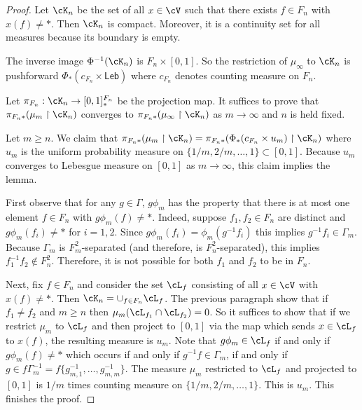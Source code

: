 \documentclass[12pt]{article}
\theoremstyle{plain}
\theoremstyle{definition}
\theoremstyle{remark}
\newcommand{\G}{\Gamma}
\newcommand{\resto}{\upharpoonright}
\begin{document}
\begin{proof}
Let $\cK_n$ be the set of all $x\in \cV$ such that there exists $f \in F_n$ with $x(f)\ne *$. Then $\cK_n$ is compact. Moreover, it is a continuity set for all measures because its boundary is empty.

The inverse image $\Phi^{-1}(\cK_n)$ is $F_n \times [0,1]$. So the restriction of $\mu_\infty$ to $\cK_n$ is pushforward $\Phi_*(c_{F_n} \times \mathsf{Leb})$ where $c_{F_n}$ denotes counting measure on $F_n$.

Let $\pi_{F_n}: \cK_n \to [0,1]_*^{F_n}$ be the projection map. It suffices to prove that $\pi_{F_n*}(\mu_m\resto \cK_n)$ converges to $\pi_{F_n*}(\mu_\infty\resto \cK_n)$ as $m\to\infty$ and $n$ is held fixed. 






Let $m\ge n$. We claim that $\pi_{F_n*}(\mu_m\resto \cK_n) = \pi_{F_n*}(\Phi_*(c_{F_n} \times u_m)\resto \cK_n)$ where $u_m$ is the uniform probability measure on $\{1/m,2/m,\ldots, 1\} \subset [0,1]$. Because $u_m$ converges to Lebesgue measure on $[0,1]$ as $m\to\infty$, this claim implies the lemma.


First observe that for any $g\in \G$, $g\phi_m$ has the property that there is at most one element $f\in F_n$ with $g\phi_m(f)\ne *$. Indeed, suppose $f_1,f_2 \in F_n$ are distinct and $g\phi_m(f_i)\ne *$ for $i=1,2$. Since $g\phi_m(f_i)=\phi_m(g^{-1}f_i)$ this implies $g^{-1}f_i \in \G_m$. Because $\G_m$ is $F_m^2$-separated (and therefore, is $F_n^2$-separated), this implies $f_1^{-1}f_2 \notin F_n^2$. Therefore, it is not possible for both $f_1$ and $f_2$ to be in $F_n$.

Next, fix $f\in F_n$ and consider the set $\cL_f$ consisting of all $x\in \cV$ with $x(f)\ne *$. Then $\cK_n = \cup_{f\in F_n} \cL_f$. The previous paragraph show that if $f_1\ne f_2$ and $m\ge n$ then $\mu_m(\cL_{f_1} \cap \cL_{f_2})=0$. So it suffices to show that if we restrict $\mu_m$ to $\cL_f$ and then project to $[0,1]$ via the map which sends $x\in \cL_f$ to $x(f)$, the resulting measure is $u_m$.  
Note that $g\phi_m \in \cL_f$ if and only if $g\phi_m(f)\ne *$ which occurs if and only if $g^{-1}f \in \G_m$, if and only if $g \in f\G_m^{-1} = f\{g_{m,1}^{-1},\ldots, g_{m,m}^{-1}\}$. The measure $\mu_m$ restricted to $\cL_f$ and projected to $[0,1]$ is $1/m$ times counting measure on $\{1/m,2/m,\ldots, 1\}$. This is $u_m$. This finishes the proof.
\end{proof}
\end{document}
